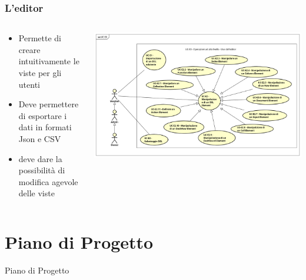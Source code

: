 \begin{frame}
  \frametitle{L'editor}
  \begin{columns}
    \begin{column}{0.5\textwidth}
      \begin{itemize}
      \item Permette di creare intuitivamente le viste per gli utenti
      \item Deve permettere di esportare i dati in formati Json e CSV
      \item deve dare la possibilità di modifica agevole delle viste
      \end{itemize}
    \end{column}
    \begin{column}{0.5\textwidth}
       \includegraphics[width=0.8\columnwidth]{res/img/Editor.png}
    \end{column}
  \end{columns}
  
  

  
\end{frame}

\section{Piano di Progetto}
\begin{frame}
    \huge Piano di Progetto
\end{frame}


